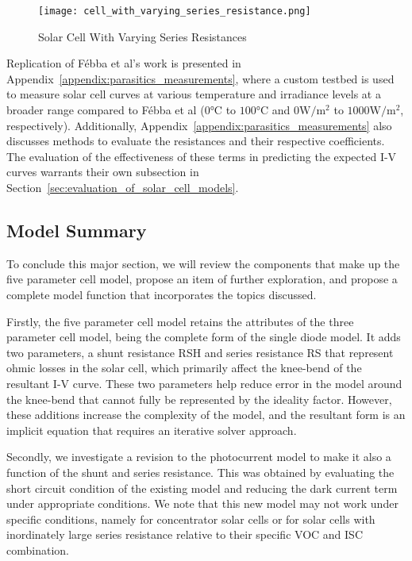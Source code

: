 \begin{figure}[h]
    \centering
    \texttt{[image: cell\_with\_varying\_series\_resistance.png]}
    \caption{Solar Cell With Varying Series Resistances~\cite{pveducation_measurement_of_series_resistance}}
    \label{fig:cell_with_varying_series_resistance}
\end{figure}

Replication of Fébba et al's work is presented in
Appendix~\ref{appendix:parasitics_measurements}, where a custom testbed is used
to measure solar cell curves at various temperature and irradiance levels at a
broader range compared to Fébba et al ($0\si{\celsius}$ to $100\si{\celsius}$
and $0\si{\watt/\meter^2}$ to $1000\si{\watt/\meter^2}$, respectively).
Additionally, Appendix~\ref{appendix:parasitics_measurements} also discusses
methods to evaluate the resistances and their respective coefficients. The
evaluation of the effectiveness of these terms in predicting the expected
\ac{I-V} curves warrants their own subsection in
Section~\ref{sec:evaluation_of_solar_cell_models}.


\subsection{Model Summary}\label{subsec:five_param_model_summary}

To conclude this major section, we will review the components that make up the
five parameter cell model, propose an item of further exploration, and propose a
complete model function that incorporates the topics discussed.

Firstly, the five parameter cell model retains the attributes of the three
parameter cell model, being the complete form of the single diode model. It adds
two parameters, a shunt resistance \ac{RSH} and series resistance \ac{RS} that
represent ohmic losses in the solar cell, which primarily affect the knee-bend of
the resultant \ac{I-V} curve. These two parameters help reduce error in the
model around the knee-bend that cannot fully be represented by the ideality
factor. However, these additions increase the complexity of the model, and the
resultant form is an implicit equation that requires an iterative solver
approach.

Secondly, we investigate a revision to the photocurrent model to make it also a
function of the shunt and series resistance. This was obtained by evaluating the
short circuit condition of the existing model and reducing the dark current term
under appropriate conditions. We note that this new model may not work under
specific conditions, namely for concentrator solar cells or for solar cells with
inordinately large series resistance relative to their specific \ac{VOC} and
\ac{ISC} combination.

